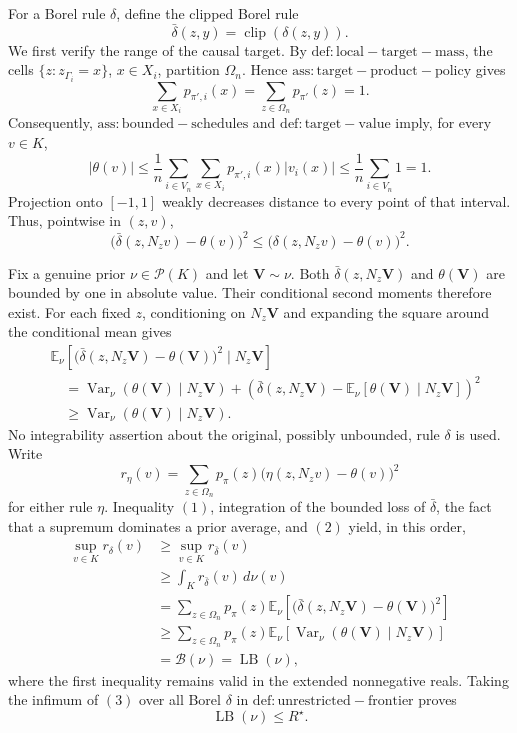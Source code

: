 For a Borel rule \(\delta\), define the clipped Borel rule
\[
 \bar\delta(z,y)=\operatorname{clip}(\delta(z,y)).
\]
We first verify the range of the causal target.  By \(\mathrm{def:local-target-mass}\), the cells \(\{z:z_{\Gamma_i}=x\}\), \(x\in X_i\), partition \(\Omega_n\).  Hence \(\mathrm{ass:target-product-policy}\) gives
\[
 \sum_{x\in X_i}p_{\pi',i}(x)
 =\sum_{z\in\Omega_n}p_{\pi'}(z)=1.
\]
Consequently, \(\mathrm{ass:bounded-schedules}\) and \(\mathrm{def:target-value}\) imply, for every \(v\in K\),
\[
 \lvert\theta(v)\rvert
 \le \frac1n\sum_{i\in V_n}\sum_{x\in X_i}
 p_{\pi',i}(x)\lvert v_i(x)\rvert
 \le \frac1n\sum_{i\in V_n}1=1.
\]
Projection onto \([-1,1]\) weakly decreases distance to every point of that interval.  Thus, pointwise in \((z,v)\),
\[
 \bigl(\bar\delta(z,N_zv)-\theta(v)\bigr)^2
 \le
 \bigl(\delta(z,N_zv)-\theta(v)\bigr)^2.                                      \tag{1}
\]

Fix a genuine prior \(\nu\in\mathcal P(K)\) and let \(\mathbf V\sim\nu\).  Both \(\bar\delta(z,N_z\mathbf V)\) and \(\theta(\mathbf V)\) are bounded by one in absolute value.  Their conditional second moments therefore exist.  For each fixed \(z\), conditioning on \(N_z\mathbf V\) and expanding the square around the conditional mean gives
\[
\begin{aligned}
 &\mathbb E_\nu\!\left[
 \bigl(\bar\delta(z,N_z\mathbf V)-\theta(\mathbf V)\bigr)^2
 \mid N_z\mathbf V\right]\\
 &\quad=
 \operatorname{Var}_\nu\!\left(\theta(\mathbf V)\mid N_z\mathbf V\right)
 +\left(
 \bar\delta(z,N_z\mathbf V)
 -\mathbb E_\nu[\theta(\mathbf V)\mid N_z\mathbf V]
 \right)^2\\
 &\quad\ge
 \operatorname{Var}_\nu\!\left(\theta(\mathbf V)\mid N_z\mathbf V\right).
\end{aligned}                                                                     \tag{2}
\]
No integrability assertion about the original, possibly unbounded, rule \(\delta\) is used.  Write
\[
 r_\eta(v)=\sum_{z\in\Omega_n}p_\pi(z)
 \bigl(\eta(z,N_zv)-\theta(v)\bigr)^2
\]
for either rule \(\eta\).  Inequality \((1)\), integration of the bounded loss of \(\bar\delta\), the fact that a supremum dominates a prior average, and \((2)\) yield, in this order,
\[
\begin{aligned}
 \sup_{v\in K}r_\delta(v)
 &\ge \sup_{v\in K}r_{\bar\delta}(v)\\
 &\ge \int_K r_{\bar\delta}(v)\,d\nu(v)\\
 &=\sum_{z\in\Omega_n}p_\pi(z)
 \mathbb E_\nu\!\left[
 \bigl(\bar\delta(z,N_z\mathbf V)-\theta(\mathbf V)\bigr)^2\right]\\
 &\ge \sum_{z\in\Omega_n}p_\pi(z)
 \mathbb E_\nu\!\left[
 \operatorname{Var}_\nu(\theta(\mathbf V)\mid N_z\mathbf V)\right]\\
 &=\mathcal B(\nu)=\operatorname{LB}(\nu),
\end{aligned}                                                                     \tag{3}
\]
where the first inequality remains valid in the extended nonnegative reals.  Taking the infimum of \((3)\) over all Borel \(\delta\) in \(\mathrm{def:unrestricted-frontier}\) proves
\[
 \operatorname{LB}(\nu)\le R^{\star}.                                           \tag{4}
\]

